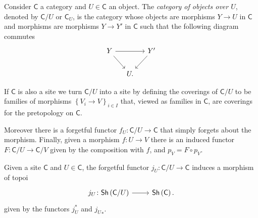 \documentclass[../Main]{subfiles}
\begin{document}
\begin{defn}
	Consider $\mathsf{C}$ a category and $U \in \mathsf{C}$ an object.
	The {\em category of objects over $U$}, denoted by $\mathsf{C}/U$
	or $\mathsf{C}_U$, is the category whose objects are morphisms
	$Y \to U$ in $\mathsf{C}$ and morphisms are morphisms $Y \to Y'$
	in $\mathsf{C}$ such that the following diagram commutes
	\begin{equation*}
	\begin{tikzcd}[column sep=1.2em]
		Y \arrow[rr, "", rightarrow] 
		\arrow[rd, "", rightarrow] & &
		Y' \arrow[ld, "", rightarrow] \\
		&
		U
	.\end{tikzcd}
	\end{equation*}
\end{defn}


\begin{rem}[]
	If $\mathsf{C}$ is also a site we turn $\mathsf{C}/U$ into a site
	by defining the coverings of $\mathsf{C}/U$ to be families
	of morphisms $\left\{ V_{ i } \to V \right\}_{ i \in I }$
	that, viewed as families in $\mathsf{C}$, are coverings for the
	pretopology on $\mathsf{C}$.

	Moreover there is a forgetful functor $f_U\colon \mathsf{C}/U \to \mathsf{C}$
	that simply forgets about the morphism.
	Finally, given a morphism $f\colon U \to V$ there is an induced
	functor $F\colon \mathsf{C}/U \to \mathsf{C}/V$ given
	by the composition with $f$, and $p_V = F \circ p_V$.
\end{rem}


\begin{lem}
	Given a site $\mathsf{C}$ and $U \in \mathsf{C}$, the forgetful functor
	$j_U\colon \mathsf{C}/U \to \mathsf{C}$ induces a
	morphism of topoi
	\begin{equation*}
	\begin{tikzcd}[row sep = 0ex
		,/tikz/column 1/.append style={anchor=base east}
		,/tikz/column 2/.append style={anchor=base west}]
		j_U\colon 
		\mathsf{Sh}\left(\mathsf{C}/U\right)\arrow[r, "", rightarrow] &
		\mathsf{Sh}\left(\mathsf{C}\right)
	.\end{tikzcd}
	\end{equation*} 
	given by the functors $j_U^*$ and ${j_U}_*$.
\end{lem} 
\end{document}
